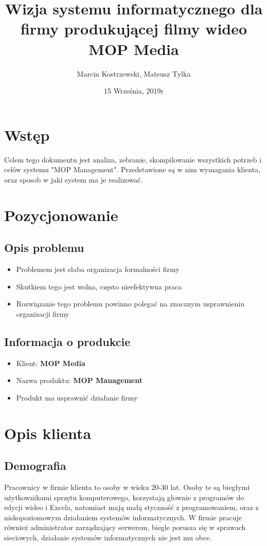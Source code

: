 \documentclass{article}
\title{Wizja systemu informatycznego dla firmy produkującej filmy wideo MOP Media}
\author{Marcin Kostrzewski, Mateusz Tylka}
\date{15 Września, 2019r}
\begin{document}
\maketitle
\newpage
\tableofcontents
\newpage

\section{Wstęp}
Celem tego dokumentu jest analiza, zebranie, skompilowanie wszystkich
potrzeb i celów systemu "MOP Management". Przedstawione są w nim wymagania klienta, oraz sposob  w jaki system ma je realizować.
\section{Pozycjonowanie}
\subsection{Opis problemu}
\begin{itemize}
    \item Problemem jest słaba organizacja formalności firmy
    \item Skutkiem tego jest wolna, często nieefektywna praca
    \item Rozwiązanie tego problemu powinno polegać na znacznym usprawnieniu organizacji firmy
\end{itemize}
\subsection{Informacja o produkcie}
\begin{itemize}
    \item Klient: \textbf{MOP Media}
    \item Nazwa produktu: \textbf{MOP Management}
    \item Produkt ma usprawnić działanie firmy
\end{itemize}
\section{Opis klienta}
\subsection{Demografia}
Pracownicy w firmie klienta to osoby w wieku 20-30 lat.
Osoby te są biegłymi użytkownikami sprzętu komputerowego, korzystają
głownie z programów do edycji wideo i Excela, natomiast mają małą
styczność z programowaniem, oraz z niskopoziomowym działaniem systemów
informatycznych. W firmie pracuje również administrator zarządzający
serwerem, biegle porusza się w sprawach sieciowych, działanie systemów
informatycznych nie jest mu obce.
\end{document}
